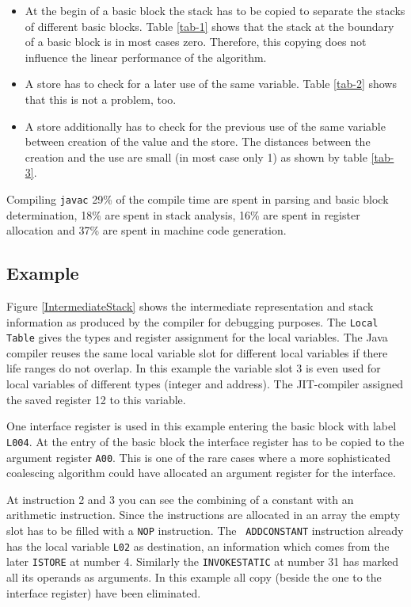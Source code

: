 \begin{itemize}
\item At the begin of a basic block the stack has to be copied to separate
      the stacks of different basic blocks. Table \ref{tab-1} shows that
      the stack at the boundary of a basic block is in most cases zero.
      Therefore, this copying does not influence the linear performance of
      the algorithm.
\item A store has to check for a later use of the same variable. Table
      \ref{tab-2} shows that this is not a problem, too.
\item A store additionally has to check for the previous use of the same
      variable between creation of the value and the store. The distances
      between the creation and the use are small (in most case only 1) as
      shown by table \ref{tab-3}.
\end{itemize}

Compiling {\tt javac} 29\% of the compile time are spent in parsing and
basic block determination, 18\% are spent in stack analysis, 16\% are spent
in register allocation and 37\% are spent in machine code generation.


\subsection{Example}

Figure \ref{IntermediateStack} shows the intermediate representation and
stack information as produced by the compiler for debugging purposes. The
{\tt Local Table} gives the types and register assignment for the local
variables. The Java compiler reuses the same local variable slot for
different local variables if there life ranges do not overlap. In this
example the variable slot 3 is even used for local variables of different
types (integer and address). The JIT-compiler assigned the saved register
12 to this variable.

One interface register is used in this example entering the basic block
with label {\tt L004}. At the entry of the basic block the interface
register has to be copied to the argument register {\tt A00}. This is one
of the rare cases where a more sophisticated coalescing algorithm could
have allocated an argument register for the interface.

At instruction 2 and 3 you can see the combining of a constant with an
arithmetic instruction. Since the instructions are allocated in an array
the empty slot has to be filled with a {\tt NOP} instruction. The {\tt
ADDCONSTANT} instruction already has the local variable {\tt L02} as
destination, an information which comes from the later {\tt ISTORE} at
number 4. Similarly the {\tt INVOKESTATIC} at number 31 has marked all its
operands as arguments. In this example all copy (beside the one to the
interface register) have been eliminated.

